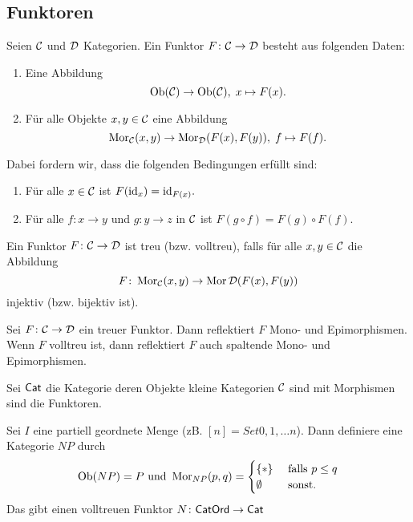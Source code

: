 \subsection{Funktoren}
\begin{Def}[Funktor]
    Seien $\mathcal{C}$ und $\mathcal{D}$ Kategorien. Ein Funktor $F\colon\mathcal{C}\to\mathcal{D}$ besteht aus folgenden Daten:
    \begin{enumerate}
        \item Eine Abbildung $$\operatorname{Ob}(\mathcal{C})\to\operatorname{Ob}(\mathcal{C}),\; x\mapsto F(x).$$
        \item Für alle Objekte $x,y\in\mathcal{C}$ eine Abbildung 
        $$\operatorname{Mor}_{\mathcal{C}}(x,y)\to\operatorname{Mor}_{\mathcal{D}}(F(x),F(y)),\; f\mapsto F(f).$$
    \end{enumerate} Dabei fordern wir, dass die folgenden Bedingungen erfüllt sind:
    \begin{enumerate}
        \item Für alle $x\in\mathcal{C}$ ist $F(\mathrm{id}_x)=\mathrm{id}_{F(x)}.$
        \item Für alle $f\colon x\to y$ und $g\colon y\to z$ in $\mathcal{C}$ ist $F(g\circ f)=F(g)\circ F(f).$
    \end{enumerate}
    Ein Funktor $F\colon\mathcal{C}\to\mathcal{D}$ ist treu (bzw. volltreu), falls für alle $x,y\in \mathcal{C}$ die Abbildung $$F\colon\operatorname{Mor}_{\mathcal{C}}(x,y)\to\operatorname{Mor}\mathcal{D}(F(x),F(y))$$  injektiv (bzw. bijektiv ist).
\end{Def}
\begin{Bem}
    Sei $F\colon\mathcal{C}\to \mathcal{D}$ ein treuer Funktor. Dann reflektiert $F$ Mono- und Epimorphismen. Wenn $F$ volltreu ist, dann reflektiert $F$ auch spaltende Mono- und Epimorphismen.
\end{Bem}
\begin{Def}
    Sei $\mathsf{Cat}$ die Kategorie deren Objekte kleine Kategorien $\mathcal{C}$ sind mit Morphismen sind die Funktoren.
\end{Def}
\begin{Def}
    Sei $I$ eine partiell geordnete Menge (zB. $[n]=Set{0,1,\dots n}$). Dann definiere eine Kategorie $N P$ durch $$\operatorname{Ob}(N P)=P\text{ und } \operatorname{Mor}_{N P}(p,q)=\begin{cases}
        \{*\} & \text{ falls } p\leq q\\
        \emptyset & \text{ sonst.}
    \end{cases}$$
    Das gibt einen volltreuen Funktor $N\colon \mathsf{CatOrd}\to\mathsf{Cat}$ 
\end{Def}
